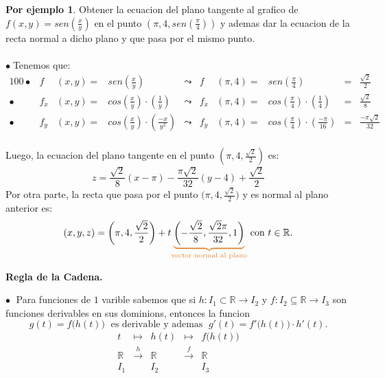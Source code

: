 \documentclass{article}
\theoremstyle{definition}
\theoremstyle{definition}
\newtheorem*{ej}{Por ejemplo}
\theoremstyle{remark}
\newcommand\bl{$\bullet\;$}
\begin{document}
\begin{ej}
  Obtener la ecuacion del plano tangente al grafico de \mbox{$f(x,y)=sen\left(\frac{x}{y}\right)$} en el punto $\left(\pi, 4, sen\left(\frac{\pi}{4}\right)\right)$ y ademas dar la ecuacion de la recta normal a dicho plano y que pasa por el mismo punto.\\\\
  \bl Tenemos que: \begin{alignat*}{100}
    \bullet & f & (x,y)=&sen\left(\frac{x}{y}\right) &\leadsto & f & (\pi,4) = & sen\left(\frac{\pi}{4}\right) & = & \frac{\sqrt{2}}{2} \\
    \bullet & f_x & (x,y)=&cos\left(\frac{x}{y}\right)\cdot \left(\frac{1}{y}\right) &\leadsto & f_x & (\pi,4) = & cos\left(\frac{\pi}{4}\right) \cdot \left(\frac{1}{4}\right) &= & \frac{\sqrt{2}}{8} \\
    \bullet & f_y & (x,y)=&cos\left(\frac{x}{y}\right)\cdot \left(\frac{-x}{y^2}\right) &\leadsto & f_y & (\pi,4) = & cos\left(\frac{\pi}{4}\right) \cdot \left(\frac{-\pi}{16}\right)&  = & \frac{-\pi\sqrt{2}}{32} 
    \end{alignat*} \\ Luego, la ecuacion del plano tangente en el punto $\left(\pi,4,\frac{\sqrt{2}}{2}\right)$ es: \[ 
    z=\frac{\sqrt{2}}{8}(x - \pi)-\frac{\pi\sqrt{2}}{32}(y-4)+\frac{\sqrt{2}}{2}
  \] Por otra parte, la recta que pasa por el punto $\big(\pi,4,\frac{\sqrt{2}}{2}\big)$ y es normal al plano anterior es: \[
  (x,y,z)=\left(\pi,4,\frac{\sqrt{2}}{2}\right)+t\textcolor{rojop2}{\underbrace{\textcolor{black}{\left(-\frac{\sqrt{2}}{8},\frac{\sqrt{2}\pi}{32},1\right)}}_{\text{vector normal al plano}}} \text{ con } t \in \mathbb{R}
  .\]
\end{ej}
\pagebreak
\begin{center}
\textbf{Regla de la Cadena.}
\end{center}
\textcolor{rojop2}{\bl} Para funciones de $1$ varible sabemos que si $h : I_1 \subset \mathbb{R} \to I_2 $ y $ f: I_2 \subseteq \mathbb{R} \to I_3$ son funciones derivables en sus dominions, entonces la funcion \[
  g(t)=f\big(h(t)\big) \; \text{ es derivable y ademas }\; g'(t) = f'\big(h(t)\big)\cdot h'(t).
  \]
  $$\begin{array}{lcccc}
  t & \mapsto & h(t) & \mapsto & f\big(h(t)\big) \\
  \mathbb{R} & \xrightarrow{h} & \mathbb{R} & \xrightarrow{f} & \mathbb{R} \\
  I_1 & & I_2 & & I_3
\end{array}$$
\end{document}
